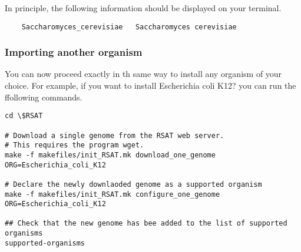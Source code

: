 In principle, the following information should be displayed on your
terminal.

\begin{footnotesize}
\begin{verbatim}
    Saccharomyces_cerevisiae   Saccharomyces cerevisiae
\end{verbatim}
\end{footnotesize}

\subsubsection{Importing another organism}

You can now proceed exactly in th same way to install any organism of
your choice. For example, if you want to install Escherichia coli K12?
you can run the ffollowing commands.

\begin{footnotesize}
\begin{verbatim}
cd \$RSAT

# Download a single genome from the RSAT web server. 
# This requires the program wget.
make -f makefiles/init_RSAT.mk download_one_genome ORG=Escherichia_coli_K12

# Declare the newly downlaoded genome as a supported organism
make -f makefiles/init_RSAT.mk configure_one_genome ORG=Escherichia_coli_K12

## Check that the new genome has bee added to the list of supported organisms
supported-organisms
\end{verbatim}
\end{footnotesize}

